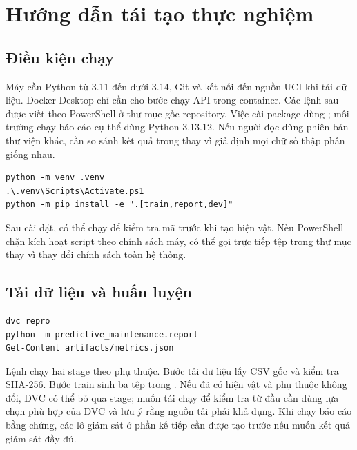 \chapter{Hướng dẫn tái tạo thực nghiệm}
\section{Điều kiện chạy}
Máy cần Python từ 3.11 đến dưới 3.14, Git và kết nối đến nguồn UCI khi tải dữ liệu. Docker Desktop chỉ cần cho bước chạy API trong container. Các lệnh sau được viết theo PowerShell ở thư mục gốc repository. Việc cài package dùng ; môi trường chạy báo cáo cụ thể dùng Python 3.13.12. Nếu người đọc dùng phiên bản thư viện khác, cần so sánh kết quả trong  thay vì giả định mọi chữ số thập phân giống nhau.

\begin{lstlisting}[language={},caption={Tạo môi trường và cài phụ thuộc}]
python -m venv .venv
.\.venv\Scripts\Activate.ps1
python -m pip install -e ".[train,report,dev]"
\end{lstlisting}
Sau cài đặt, có thể chạy  để kiểm tra mã trước khi tạo hiện vật. Nếu PowerShell chặn kích hoạt script theo chính sách máy, có thể gọi trực tiếp tệp  trong thư mục  thay vì thay đổi chính sách toàn hệ thống.

\section{Tải dữ liệu và huấn luyện}
\begin{lstlisting}[language={},caption={Chạy pipeline và kiểm tra hiện vật}]
dvc repro
python -m predictive_maintenance.report
Get-Content artifacts/metrics.json
\end{lstlisting}
Lệnh  chạy hai stage theo phụ thuộc. Bước tải dữ liệu lấy CSV gốc và kiểm tra SHA-256. Bước train sinh ba tệp trong . Nếu đã có hiện vật và phụ thuộc không đổi, DVC có thể bỏ qua stage; muốn tái chạy để kiểm tra từ đầu cần dùng lựa chọn phù hợp của DVC và lưu ý rằng nguồn tải phải khả dụng. Khi chạy báo cáo bằng chứng, các lô giám sát ở phần kế tiếp cần được tạo trước nếu muốn kết quả giám sát đầy đủ.

